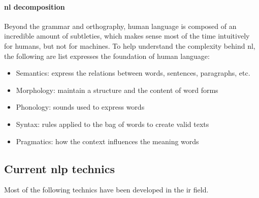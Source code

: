 \paragraph{\gls{nl} decomposition}
Beyond the grammar and orthography, human language is composed of an incredible amount of subtleties, which makes sense most of the time intuitively for humans, but not for machines. To help understand the complexity behind \gls{nl}, the following are list expresses the foundation of human language:

\begin{itemize}
    \setlength\itemsep{0em}
    \item Semantics: express the relations between words, sentences, paragraphs, etc.
    \item Morphology: maintain a structure and the content of word forms
    \item Phonology: sounds used to express words
    \item Syntax: rules applied to the bag of words to create valid texts
    \item Pragmatics: how the context influences the meaning words
\end{itemize}



\subsection{Current \gls{nlp} technics}
Most of the following technics have been developed in the \gls{ir} field.

